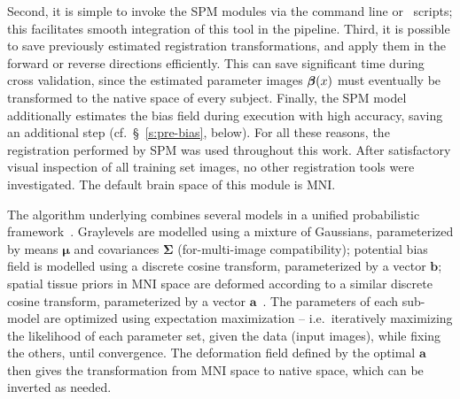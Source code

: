 Second, it is simple to invoke the SPM modules via the command line or \matlab\ scripts;
this facilitates smooth integration of this tool in the pipeline.
Third, it is possible to save previously estimated registration transformations,
and apply them in the forward or reverse directions efficiently.
This can save significant time during cross validation,
since the estimated parameter images $\bm{\beta}(x)$ must eventually be transformed
to the native space of every subject.
Finally, the SPM  model additionally estimates the bias field during execution
with high accuracy, saving an additional step (cf.~\S~\ref{s:pre-bias}, below).
For all these reasons, the registration performed by SPM 
was used throughout this work.
After satisfactory visual inspection of all training set images,
no other registration tools were investigated.
The default brain space of this module is MNI.
\par
The algorithm underlying  combines several models
in a unified probabilistic framework~\cite{Ashburner2005}.
Graylevels are modelled using a mixture of Gaussians,
parameterized by means $\bm{\mu}$ and covariances $\bm{\Sigma}$ (for-multi-image compatibility);
potential bias field is modelled using a discrete cosine transform,
parameterized by a vector $\bm{b}$;
spatial tissue priors in MNI space are deformed according to a similar discrete cosine transform,
parameterized by a vector $\bm{a}$~\cite{Ashburner1999}.
The parameters of each sub-model are optimized using expectation maximization
-- i.e.\ iteratively maximizing the likelihood of each parameter set,
given the data (input images), while fixing the others, until convergence.
The deformation field defined by the optimal $\bm{a}$ then gives
the transformation from MNI space to native space,
which can be inverted as needed.
